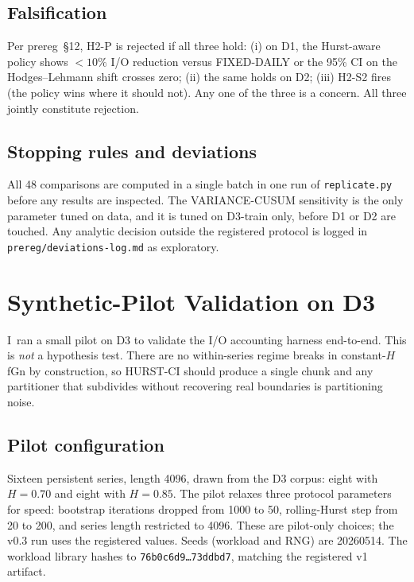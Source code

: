 \documentclass[11pt]{article}
\begin{document}
\subsection{Falsification}

Per prereg~\S12, H2-P is rejected if all three hold: (i) on D1, the Hurst-aware policy shows $<10\%$ I/O reduction versus FIXED-DAILY or the 95\% CI on the Hodges--Lehmann shift crosses zero; (ii) the same holds on D2; (iii) H2-S2 fires (the policy wins where it should not). Any one of the three is a concern. All three jointly constitute rejection.

\subsection{Stopping rules and deviations}

All 48 comparisons are computed in a single batch in one run of \texttt{replicate.py} before any results are inspected. The VARIANCE-CUSUM sensitivity is the only parameter tuned on data, and it is tuned on D3-train only, before D1 or D2 are touched. Any analytic decision outside the registered protocol is logged in \texttt{prereg/deviations-log.md} as exploratory.

\section{Synthetic-Pilot Validation on D3}
\label{sec:pilot}

I~ran a small pilot on D3 to validate the I/O accounting harness end-to-end. This is \emph{not} a hypothesis test. There are no within-series regime breaks in constant-$H$ fGn by construction, so HURST-CI should produce a single chunk and any partitioner that subdivides without recovering real boundaries is partitioning noise.

\subsection{Pilot configuration}

Sixteen persistent series, length 4096, drawn from the D3 corpus: eight with $H=0.70$ and eight with $H=0.85$. The pilot relaxes three protocol parameters for speed: bootstrap iterations dropped from 1000 to 50, rolling-Hurst step from 20 to 200, and series length restricted to 4096. These are pilot-only choices; the v0.3 run uses the registered values. Seeds (workload and RNG) are 20260514. The workload library hashes to \texttt{76b0c6d9\ldots73ddbd7}, matching the registered v1 artifact.
\end{document}
